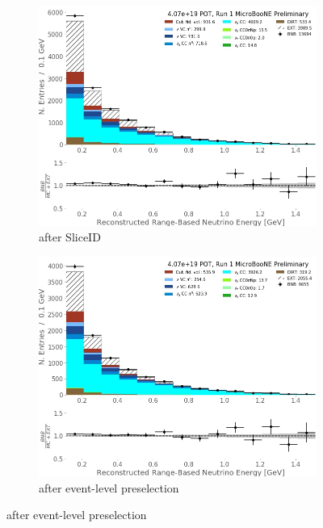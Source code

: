 \begin{figure}[] 
\begin{center}
    \begin{subfigure}[b]{0.3\textwidth}
    \centering
    \includegraphics[width=1.00\textwidth]{NuMuCCsel/Images/Ryan/Run1_recoErange_SliceID.jpg}
    \caption{\label{fig:NuMUCCsel:ryan:trklenSliceID} after SliceID}
    \end{subfigure}
    \begin{subfigure}[b]{0.3\textwidth}
    \centering
    \includegraphics[width=1.00\textwidth]{NuMuCCsel/Images/Ryan/Run1_recoErange_EvtSel.jpg}
    \caption{\label{fig:NuMUCCsel:ryan:trklenEvt} after event-level preselection}

\end{subfigure}
\end{center}
\end{figure}
